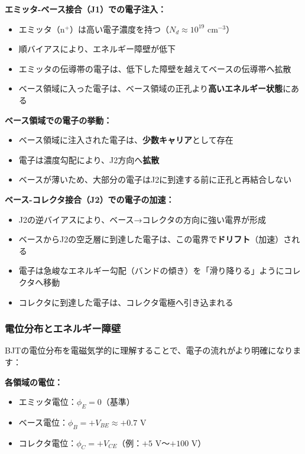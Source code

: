 \textbf{エミッタ-ベース接合（J1）での電子注入：}

\begin{itemize}
\item エミッタ（n$^+$）は高い電子濃度を持つ（$N_d \approx 10^{19}$ cm$^{-3}$）
\item 順バイアスにより、エネルギー障壁が低下
\item エミッタの伝導帯の電子は、低下した障壁を越えてベースの伝導帯へ拡散
\item ベース領域に入った電子は、ベース領域の正孔より\textbf{高いエネルギー状態}にある
\end{itemize}

\textbf{ベース領域での電子の挙動：}

\begin{itemize}
\item ベース領域に注入された電子は、\textbf{少数キャリア}として存在
\item 電子は濃度勾配により、J2方向へ\textbf{拡散}
\item ベースが薄いため、大部分の電子はJ2に到達する前に正孔と再結合しない
\end{itemize}

\textbf{ベース-コレクタ接合（J2）での電子の加速：}

\begin{itemize}
\item J2の逆バイアスにより、ベース→コレクタの方向に強い電界が形成
\item ベースからJ2の空乏層に到達した電子は、この電界で\textbf{ドリフト}（加速）される
\item 電子は急峻なエネルギー勾配（バンドの傾き）を「滑り降りる」ようにコレクタへ移動
\item コレクタに到達した電子は、コレクタ電極へ引き込まれる
\end{itemize}

\subsubsection{電位分布とエネルギー障壁}

BJTの電位分布を電磁気学的に理解することで、電子の流れがより明確になります：

\textbf{各領域の電位：}

\begin{itemize}
\item エミッタ電位：$\phi_E = 0$（基準）
\item ベース電位：$\phi_B = +V_{BE} \approx +0.7$ V
\item コレクタ電位：$\phi_C = +V_{CE}$（例：$+5$ V〜$+100$ V）
\end{itemize}

